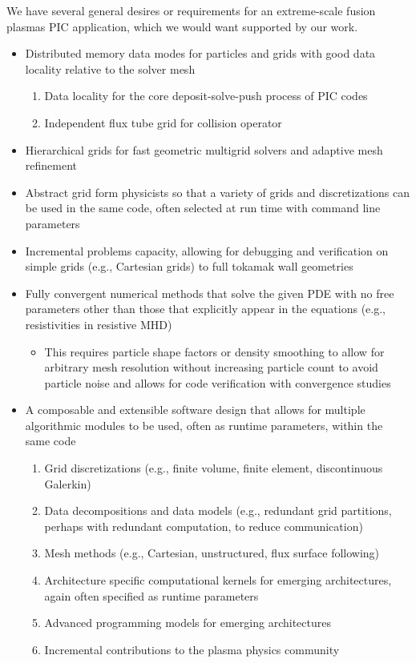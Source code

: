 \documentclass[review]{siamart}
\begin{document}
We have several general desires or requirements for an extreme-scale fusion plasmas PIC application, which we would want supported by our work.
\begin{itemize}
\item Distributed memory data modes for particles and grids with good data locality relative to the solver mesh
\begin{enumerate}
\item Data locality for the core deposit-solve-push process of PIC codes
\item Independent flux tube grid for collision operator
\end{enumerate}
\item Hierarchical grids for fast geometric multigrid solvers and adaptive mesh refinement
\item Abstract grid form physicists so that a variety of grids and discretizations can be used in the same code, often selected at run time with command line parameters
\item Incremental problems capacity, allowing for debugging and verification on simple grids (e.g., Cartesian grids) to full tokamak wall geometries
\item Fully convergent numerical methods that solve the given PDE with no free parameters other than those that explicitly appear in the equations (e.g., resistivities in resistive MHD)
\begin{itemize}
\item This requires particle shape factors or density smoothing to allow for arbitrary mesh resolution without increasing particle count to avoid particle noise and allows for code verification with convergence studies
\end{itemize}
\item A composable and extensible software design that allows for multiple algorithmic modules to be used, often as runtime parameters, within the same code
\begin{enumerate}
\item Grid discretizations (e.g., finite volume, finite element, discontinuous Galerkin)
\item Data decompositions and data models (e.g., redundant grid partitions, perhaps with redundant computation, to reduce communication)
\item Mesh methods (e.g., Cartesian, unstructured, flux surface following)
\item Architecture specific computational kernels for emerging architectures, again often specified as runtime parameters
\item Advanced programming models for emerging architectures \cite{KnepleyBrownMcInnesSmithRuppAdams2015}
\item Incremental contributions to the plasma physics community
\end{enumerate}
\end{itemize}
\end{document}

